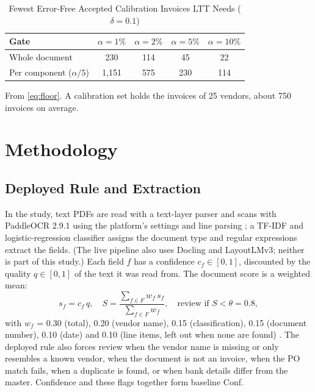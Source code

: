 \documentclass[conference]{IEEEtran}
\newcommand{\sysB}{\textsf{Conf}}          %
\begin{document}
\begin{table}[t]
\caption{Fewest Error-Free Accepted Calibration Invoices LTT Needs (\boldmath$\delta=0.1$)}
\begin{center}
\setlength{\tabcolsep}{4pt}
\begin{tabular}{|l|c|c|c|c|}
\hline
\textbf{Gate} & \textbf{$\alpha=1\%$} & \textbf{$\alpha=2\%$} & \textbf{$\alpha=5\%$} & \textbf{$\alpha=10\%$} \\
\hline
Whole document & 230 & 114 & 45 & 22 \\
Per component ($\alpha/5$) & 1,151 & 575 & 230 & 114 \\
\hline
\end{tabular}

\vspace{2pt}
\parbox{\columnwidth}{\footnotesize From \eqref{eq:floor}. A calibration set
holds the invoices of 25 vendors, about 750 invoices on average.}
\label{tab:floor}
\end{center}
\end{table}

\section{Methodology}\label{sec:method}
\subsection{Deployed Rule and Extraction}\label{sec:deployed}
In the study, text PDFs are read with a text-layer parser and scans with
PaddleOCR 2.9.1 using the platform's settings and line
parsing \cite{cui2025paddleocr}; a TF-IDF and logistic-regression classifier assigns the document type and regular expressions
extract the fields. (The live pipeline also uses
Docling \cite{auer2024docling} and LayoutLMv3; neither is part of this study.) Each field $f$ has a confidence $c_f\in[0,1]$,
discounted by the quality $q\in[0,1]$ of the text it was read from. The
document score is a weighted mean:
\begin{equation}
s_f = c_f\,q,\quad
S=\frac{\sum_{f\in F} w_f\, s_f}{\sum_{f\in F} w_f},\quad
\text{review if } S<\theta=0.8,
\label{eq:conf}
\end{equation}
with $w_f$ = 0.30 (total), 0.20 (vendor name), 0.15 (classification), 0.15
(document number), 0.10 (date) and 0.10 (line items, left out when none are
found) \cite{more2026report}. The deployed rule also forces review when the
vendor name is missing or only resembles a known vendor, when the
document is not an invoice, when the PO match fails, when a
duplicate is found, or when bank details differ from the master. Confidence and
these flags together form baseline \sysB.
\end{document}
